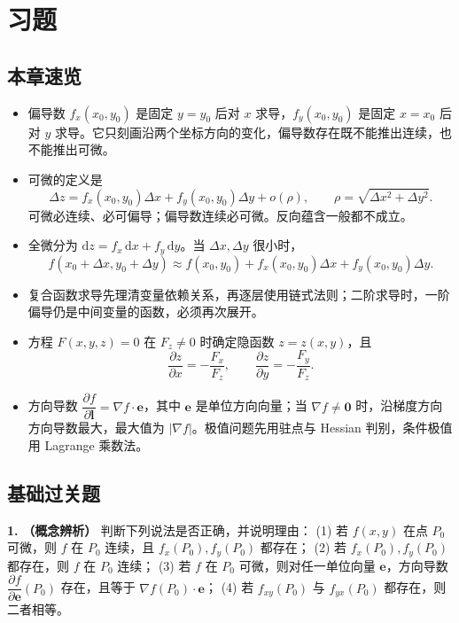 \section{习题}

\subsection{本章速览}

\begin{itemize}
    \item 偏导数 \(f_x(x_0,y_0)\) 是固定 \(y=y_0\) 后对 \(x\) 求导，\(f_y(x_0,y_0)\) 是固定 \(x=x_0\) 后对 \(y\) 求导。它只刻画沿两个坐标方向的变化，偏导数存在既不能推出连续，也不能推出可微。
    \item 可微的定义是
    \[
        \varDelta z=f_x(x_0,y_0)\varDelta x+f_y(x_0,y_0)\varDelta y+o(\rho),
        \qquad \rho=\sqrt{\varDelta x^2+\varDelta y^2}.
    \]
    可微必连续、必可偏导；偏导数连续必可微。反向蕴含一般都不成立。
    \item 全微分为 \(\mathrm dz=f_x\,\mathrm dx+f_y\,\mathrm dy\)。当 \(\varDelta x,\varDelta y\) 很小时，
    \[
        f(x_0+\varDelta x,y_0+\varDelta y)\approx f(x_0,y_0)+f_x(x_0,y_0)\varDelta x+f_y(x_0,y_0)\varDelta y.
    \]
    \item 复合函数求导先理清变量依赖关系，再逐层使用链式法则；二阶求导时，一阶偏导仍是中间变量的函数，必须再次展开。
    \item 方程 \(F(x,y,z)=0\) 在 \(F_z\neq0\) 时确定隐函数 \(z=z(x,y)\)，且
    \[
        \frac{\partial z}{\partial x}=-\frac{F_x}{F_z},\qquad
        \frac{\partial z}{\partial y}=-\frac{F_y}{F_z}.
    \]
    \item 方向导数 \(\dfrac{\partial f}{\partial \mathbf l}=\nabla f\cdot\mathbf e\)，其中 \(\mathbf e\) 是单位方向向量；当 \(\nabla f\neq\mathbf 0\) 时，沿梯度方向方向导数最大，最大值为 \(|\nabla f|\)。极值问题先用驻点与 Hessian 判别，条件极值用 Lagrange 乘数法。
\end{itemize}

\subsection{基础过关题}

\textbf{1.} \textbf{（概念辨析）} 判断下列说法是否正确，并说明理由：
(1) 若 \(f(x,y)\) 在点 \(P_0\) 可微，则 \(f\) 在 \(P_0\) 连续，且 \(f_x(P_0),f_y(P_0)\) 都存在；
(2) 若 \(f_x(P_0),f_y(P_0)\) 都存在，则 \(f\) 在 \(P_0\) 连续；
(3) 若 \(f\) 在 \(P_0\) 可微，则对任一单位向量 \(\mathbf e\)，方向导数 \(\dfrac{\partial f}{\partial\mathbf e}(P_0)\) 存在，且等于 \(\nabla f(P_0)\cdot\mathbf e\)；
(4) 若 \(f_{xy}(P_0)\) 与 \(f_{yx}(P_0)\) 都存在，则二者相等。

